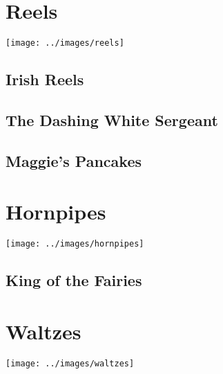 \documentclass[12pt]{report}
\newcommand*{\cleartoleftpage}{%
	\clearpage
	\ifodd\value{page}\hbox{}\newpage\fi
}
\begin{document}
\cleartoleftpage
\chapter*{Reels}
\begin{center}
\texttt{[image: ../images/reels]}
\end{center}

	\section*{Irish Reels}
	

	\cleartoleftpage
	\section*{The Dashing White Sergeant}
	

	\cleartoleftpage
	\section*{Maggie's Pancakes}
	

\cleartoleftpage
\chapter*{Hornpipes}
\begin{center}
\texttt{[image: ../images/hornpipes]}
\end{center}

	\section*{King of the Fairies}
	

\cleartoleftpage
\chapter*{Waltzes}
\begin{center}
\texttt{[image: ../images/waltzes]}
\end{center}
\end{document}
